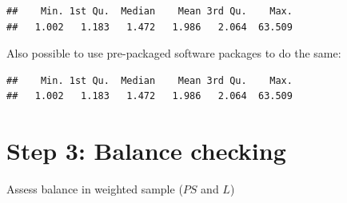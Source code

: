 \documentclass[
]{book}
\newenvironment{Shaded}{\begin{snugshade}}{\end{snugshade}}
\newcommand{\AttributeTok}[1]{\textcolor[rgb]{0.77,0.63,0.00}{#1}}
\newcommand{\DecValTok}[1]{\textcolor[rgb]{0.00,0.00,0.81}{#1}}
\newcommand{\FunctionTok}[1]{\textcolor[rgb]{0.00,0.00,0.00}{#1}}
\newcommand{\NormalTok}[1]{#1}
\newcommand{\OtherTok}[1]{\textcolor[rgb]{0.56,0.35,0.01}{#1}}
\newcommand{\SpecialCharTok}[1]{\textcolor[rgb]{0.00,0.00,0.00}{#1}}
\newcommand{\StringTok}[1]{\textcolor[rgb]{0.31,0.60,0.02}{#1}}
\begin{document}
\begin{Shaded}
\end{Shaded}

\begin{verbatim}
##    Min. 1st Qu.  Median    Mean 3rd Qu.    Max. 
##   1.002   1.183   1.472   1.986   2.064  63.509
\end{verbatim}

Also possible to use pre-packaged software packages to do the same:

\begin{Shaded}
\end{Shaded}

\begin{verbatim}
##    Min. 1st Qu.  Median    Mean 3rd Qu.    Max. 
##   1.002   1.183   1.472   1.986   2.064  63.509
\end{verbatim}

\hypertarget{step-3-balance-checking}{%
\section{Step 3: Balance checking}\label{step-3-balance-checking}}

\begin{rmdcomment}
Assess balance in weighted sample (\(PS\) and \(L\))
\end{rmdcomment}
\end{document}

